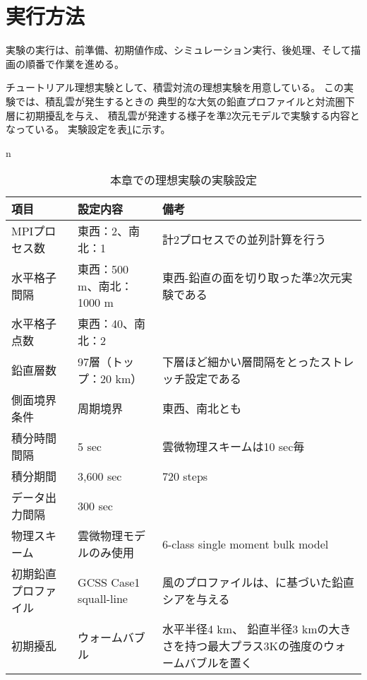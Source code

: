 \section{実行方法} \label{sec:ideal_exp_run}

実験の実行は、前準備、初期値作成、シミュレーション実行、後処理、そして描画の順番で作業を進める。


チュートリアル理想実験として、積雲対流の理想実験を用意している。
この実験では、積乱雲が発生するときの
典型的な大気の鉛直プロファイルと対流圏下層に初期擾乱を与え、
積乱雲が発達する様子を準2次元モデルで実験する内容となっている。
実験設定を表\ref{tab:setting_ideal}に示す。

\begin{table}[htb]
n\begin{center}
\caption{本章での理想実験の実験設定}
\begin{tabularx}{150mm}{|l|X|X|} \hline
 \rowcolor[gray]{0.9} 項目 & 設定内容 & 備考 \\ \hline
 MPIプロセス数 & 東西：2、南北：1 & 計2プロセスでの並列計算を行う \\ \hline
 水平格子間隔 & 東西：500 m、南北：1000 m & 東西-鉛直の面を切り取った準2次元実験である \\ \hline
 水平格子点数 & 東西：40、南北：2\footnotemark &  \\ \hline
 鉛直層数     & 97層（トップ：20 km）& 下層ほど細かい層間隔をとったストレッチ設定である \\ \hline
 側面境界条件 & 周期境界 & 東西、南北とも \\ \hline
 積分時間間隔 & 5 sec      & 雲微物理スキームは10 sec毎 \\ \hline
 積分期間     & 3,600 sec  & 720 steps \\ \hline
 データ出力間隔 & 300 sec  &  \\ \hline
 物理スキーム & 雲微物理モデルのみ使用 &
 6-class single moment bulk model \citep{tomita_2008} \\ \hline
 初期鉛直プロファイル & GCSS Case1 squall-line \citep{Redelsperger2000}&
 風のプロファイルは、\citet{Ooyama_2001}に基づいた鉛直シアを与える \\ \hline
 初期擾乱 & ウォームバブル & 水平半径4 km、
 鉛直半径3 kmの大きさを持つ最大プラス3Kの強度のウォームバブルを置く\\ \hline
\end{tabularx}
\label{tab:setting_ideal}
\end{center}
\end{table}



